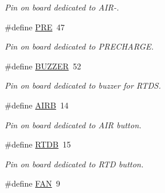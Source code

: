 \begin{DoxyCompactItemize}
\begin{DoxyCompactList}\small\item\em Pin on board dedicated to A\-I\-R-\/. \end{DoxyCompactList}\item 
\hypertarget{group___board__model__group_ga349316092037fdd0773335fab4e15ee8}{\#define \hyperlink{group___board__model__group_ga349316092037fdd0773335fab4e15ee8}{P\-R\-E}~47}\label{group___board__model__group_ga349316092037fdd0773335fab4e15ee8}

\begin{DoxyCompactList}\small\item\em Pin on board dedicated to P\-R\-E\-C\-H\-A\-R\-G\-E. \end{DoxyCompactList}\item 
\hypertarget{group___board__model__group_ga145103118f6d9d1129aa4509cf214a13}{\#define \hyperlink{group___board__model__group_ga145103118f6d9d1129aa4509cf214a13}{B\-U\-Z\-Z\-E\-R}~52}\label{group___board__model__group_ga145103118f6d9d1129aa4509cf214a13}

\begin{DoxyCompactList}\small\item\em Pin on board dedicated to buzzer for R\-T\-D\-S. \end{DoxyCompactList}\item 
\hypertarget{group___board__model__group_ga78a99c4f7bcb7723d7bf21810c4ce09b}{\#define \hyperlink{group___board__model__group_ga78a99c4f7bcb7723d7bf21810c4ce09b}{A\-I\-R\-B}~14}\label{group___board__model__group_ga78a99c4f7bcb7723d7bf21810c4ce09b}

\begin{DoxyCompactList}\small\item\em Pin on board dedicated to A\-I\-R button. \end{DoxyCompactList}\item 
\hypertarget{group___board__model__group_ga1bcd7461cf494d3235f792bf3d814923}{\#define \hyperlink{group___board__model__group_ga1bcd7461cf494d3235f792bf3d814923}{R\-T\-D\-B}~15}\label{group___board__model__group_ga1bcd7461cf494d3235f792bf3d814923}

\begin{DoxyCompactList}\small\item\em Pin on board dedicated to R\-T\-D button. \end{DoxyCompactList}\item 
\hypertarget{group___board__model__group_gacd9448edb89c378d843fc3cb93a098d3}{\#define \hyperlink{group___board__model__group_gacd9448edb89c378d843fc3cb93a098d3}{F\-A\-N}~9}\label{group___board__model__group_gacd9448edb89c378d843fc3cb93a098d3}


\end{DoxyCompactItemize}
